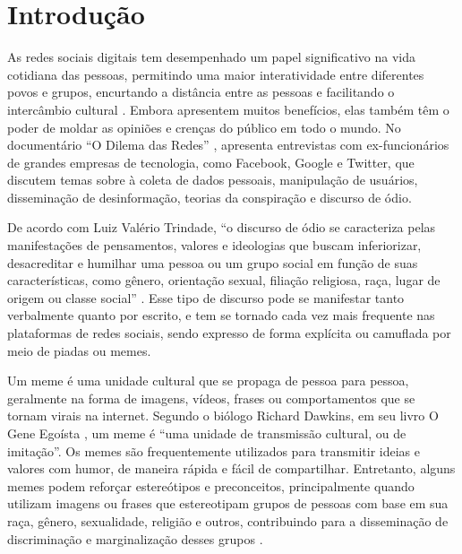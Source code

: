 \chapter{Introdução}
\label{cap:01}

As redes sociais digitais tem desempenhado um papel significativo na vida cotidiana das pessoas, permitindo uma maior interatividade entre diferentes povos e grupos, encurtando a distância entre as pessoas e facilitando o intercâmbio cultural \cite{Nascimento2017}. Embora apresentem muitos benefícios, elas também têm o poder de moldar as opiniões e crenças do público em todo o mundo. No documentário “O Dilema das Redes” \cite{SocialDilemma2020}, apresenta entrevistas com ex-funcionários de grandes empresas de tecnologia, como Facebook, Google e Twitter, que discutem temas sobre à coleta de dados pessoais, manipulação de usuários, disseminação de desinformação, teorias da conspiração e discurso de ódio.


De acordo com Luiz Valério Trindade, ``o discurso de ódio se caracteriza pelas manifestações de pensamentos, valores e ideologias que buscam inferiorizar, desacreditar e humilhar uma pessoa ou um grupo social em função de suas características, como gênero, orientação sexual, filiação religiosa, raça, lugar de origem ou classe social'' \cite{Trindade2022}. Esse tipo de discurso pode se manifestar tanto verbalmente quanto por escrito, e tem se tornado cada vez mais frequente nas plataformas de redes sociais, sendo expresso de forma explícita ou camuflada por meio de piadas ou memes.


Um meme é uma unidade cultural que se propaga de pessoa para pessoa, geralmente na forma de imagens, vídeos, frases ou comportamentos que se tornam virais na internet. Segundo o biólogo Richard Dawkins, em seu livro O Gene Egoísta \cite{Dawkins1976}, um meme é ``uma unidade de transmissão cultural, ou de imitação''. Os memes são frequentemente utilizados para transmitir ideias e valores com humor, de maneira rápida e fácil de compartilhar. Entretanto, alguns memes podem reforçar estereótipos e preconceitos, principalmente quando utilizam imagens ou frases que estereotipam grupos de pessoas com base em sua raça, gênero, sexualidade, religião e outros, contribuindo para a disseminação de discriminação e marginalização desses grupos \cite{Burke2004}.

